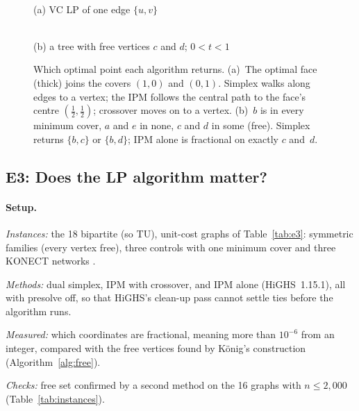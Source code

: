 \begin{figure}[H]
  \centering
  \begin{minipage}[b]{0.38\textwidth}\centering
    \\[2pt]
    (a) VC LP of one edge $\{u,v\}$
  \end{minipage}\hfill
  \begin{minipage}[b]{0.58\textwidth}\centering
    \\[2pt]
    (b) a tree with free vertices $c$ and $d$; $0<t<1$
  \end{minipage}
  \caption{Which optimal point each algorithm returns. (a)~The optimal face (thick) joins the covers $(1,0)$ and $(0,1)$. Simplex walks along edges to a vertex; the IPM follows the central path to the face's centre $(\tfrac12,\tfrac12)$; crossover moves on to a vertex. (b)~$b$ is in every minimum cover, $a$ and $e$ in none, $c$ and $d$ in some (free). Simplex returns $\{b,c\}$ or $\{b,d\}$; IPM alone is fractional on exactly $c$ and~$d$.}
  \label{fig:paths}
\end{figure}

\subsection{E3: Does the LP algorithm matter?}\label{sec:e3}

\paragraph{Setup.}
\begin{setup}
  \item \emph{Instances:} the 18 bipartite (so TU), unit-cost graphs of Table~\ref{tab:e3}: symmetric families (every vertex free), three controls with one minimum cover and three KONECT networks \cite{kunegis2013}.
  \item \emph{Methods:} dual simplex, IPM with crossover, and IPM alone (HiGHS~1.15.1), all with presolve off, so that HiGHS's clean-up pass cannot settle ties before the algorithm runs.
  \item \emph{Measured:} which coordinates are fractional, meaning more than $10^{-6}$ from an integer, compared with the free vertices found by König's construction (Algorithm~\ref{alg:free}).
  \item \emph{Checks:} free set confirmed by a second method on the 16 graphs with $n\le 2{,}000$ (Table~\ref{tab:instances}).
\end{setup}

